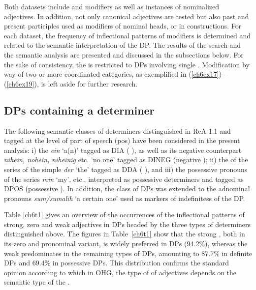 \documentclass[output=paper,colorlinks,citecolor=brown]{langscibook}
\begin{document}
Both datasets include  and  modifiers as well as
instances of nominalized adjectives. In addition, not only canonical
adjectives are tested but also past and present participles used as
modifiers of nominal heads, or in  constructions. For each
dataset, the frequency of inflectional patterns of modifiers is
determined and related to the semantic interpretation of the DP. The
results of the  search and the semantic analysis are presented and
discussed in the subsections below. For the sake of consistency, the
 is restricted to DPs involving single .
Modification by way of two or more coordinated categories, as
exemplified in (\ref{ch6ex17})--(\ref{ch6ex19}), is left aside for further research.

\subsection{DPs containing a determiner}\label{sec:DPDet}
\begin{sloppypar}
The following semantic classes of determiners distinguished in ReA 1.1
and tagged at the level of part of speech (pos) have been considered in
the present analysis: i) the   \emph{ein} `a(n)'
tagged as DIA ( ), as well as its negative counterpart \emph{nihein, nohein,
niheinig} etc. `no one' tagged as DINEG (negative  ); ii) the  of
the series of the simple   \emph{der} `the' tagged
as DDA ( ), and iii) the possessive pronouns of the series \emph{min} `my',
etc., interpreted as possessive determiners and tagged as DPOS (possessive ). In
addition, the class of  DPs was extended to the adnominal
 pronouns \emph{sum/sumalih} `a certain one' used as markers
of indefinitess of the DP.
\end{sloppypar}

Table \ref{ch6t1} gives an overview of the occurrences of the inflectional
patterns of strong, zero and weak adjectives in DPs headed by the three
types of determiners distinguished above. The figures in Table~\ref{ch6t1} show that the strong , both in its zero and pronominal variant, is widely preferred in  DPs (94.2\%), whereas the weak  predominates in the remaining types of DPs, amounting to 87.7\% in definite DPs and 69.4\% in possessive DPs. This
distribution confirms the standard opinion according to which in OHG,
the type of  of adjectives depends on the semantic type of the
.
\end{document}
